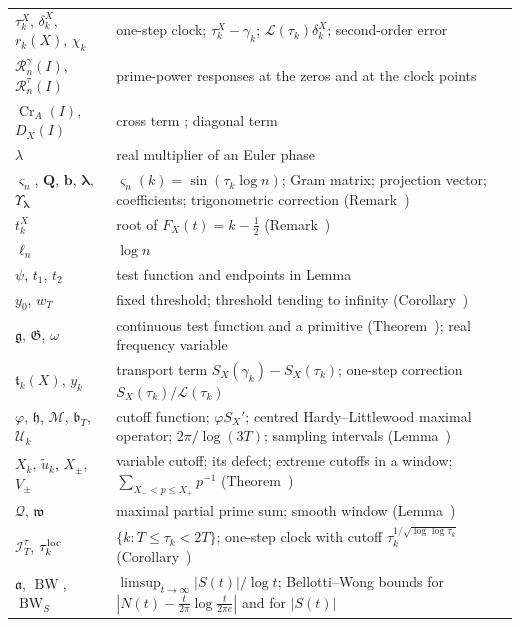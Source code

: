 \documentclass[preprint,12pt]{elsarticle}
\makeatletter
\let\CG@origref\ref
\let\CG@origeqref\eqref
\newcommand{\CG@gettip}[1]{\@ifundefined{CGTip@#1}{Reference: #1}{\csname CGTip@#1\endcsname}}
\DeclareRobustCommand{\CGref}[1]{\pdftooltip{\CG@origref{#1}}{\CG@gettip{#1}}}
\DeclareRobustCommand{\CGeqref}[1]{\pdftooltip{\CG@origeqref{#1}}{\CG@gettip{#1}}}
\numberwithin{equation}{section}
\theoremstyle{plain}
\theoremstyle{definition}
\theoremstyle{remark}
\newcommand{\lL}{\mathcal L}
\newcommand{\Cr}{\operatorname{Cr}}
\newcommand{\BW}{\operatorname{BW}}
\newcommand{\Rg}{\mathcal R^{\gamma}}
\newcommand{\Rt}{\mathcal R^{\tau}}
\newcommand{\BWS}{\operatorname{BW}_S}
\makeatother
\begin{document}
\begin{center}
\begin{longtable}{p{}p{}}
$\tau_k^X$, $\delta_k^X$, $r_k(X)$, $\chi_k$ & one-step clock; $\tau_k^X-\gamma_k$; $\lL(\tau_k)\delta_k^X$; second-order error \CGeqref{eq:one_step_decomposition}\\
$\Rg_n(I)$, $\Rt_n(I)$ & prime-power responses at the zeros and at the clock points \CGeqref{eq:two_responses}\\
$\Cr_A(I)$, $D_X(I)$ & cross term \CGeqref{eq:Cr_def}; diagonal term \CGeqref{eq:full_factor_gain}\\
$\lambda$ & real multiplier of an Euler phase\\
$\varsigma_n$, $\mathbf Q$, $\mathbf b$, $\boldsymbol\lambda$, $\Upsilon_{\boldsymbol\lambda}$ & $\varsigma_n(k)=\sin(\tau_k\log n)$; Gram matrix; projection vector; coefficients; trigonometric correction (Remark~\CGref{rem:matrix_projection})\\
$t_k^X$ & root of $F_X(t)=k-\frac12$ (Remark~\CGref{rem:localization})\\
$\ell_n$ & $\log n$\\
$\psi$, $t_1$, $t_2$ & test function and endpoints in Lemma~\CGref{lem:first_moment_identity}\\
$y_0$, $w_T$ & fixed threshold; threshold tending to infinity (Corollary~\CGref{cor:dichotomy})\\
$\mathfrak g$, $\mathfrak G$, $\omega$ & continuous test function and a primitive (Theorem~\CGref{thm:identity_g}); real frequency variable\\
$\mathfrak t_k(X)$, $y_k$ & transport term $S_X(\gamma_k)-S_X(\tau_k)$; one-step correction $S_X(\tau_k)/\lL(\tau_k)$\\
$\varphi$, $\mathfrak h$, $\mathcal M$, $\mathfrak b_T$, $\mathcal U_k$ & cutoff function; $\varphi S_X'$; centred Hardy--Littlewood maximal operator; $2\pi/\log(3T)$; sampling intervals (Lemma~\CGref{lem:transport})\\
$X_k$, $\tilde u_k$, $X_\pm$, $V_\pm$ & variable cutoff; its defect; extreme cutoffs in a window; $\sum_{X_-<p\le X_+}p^{-1}$ (Theorem~\CGref{thm:variable_cutoff})\\
$\mathcal Q$, $\mathfrak w$ & maximal partial prime sum; smooth window (Lemma~\CGref{lem:maximal_primes})\\
$\mathcal I_T^\tau$, $\tau_k^{\rm loc}$ & $\{k:T\le\tau_k<2T\}$; one-step clock with cutoff $\tau_k^{1/\sqrt{\log\log\tau_k}}$ (Corollary~\CGref{cor:local_clock})\\
$\mathfrak a$, $\BW$, $\BWS$ & $\limsup_{t\to\infty}|S(t)|/\log t$; Bellotti--Wong bounds for $|N(t)-\frac t{2\pi}\log\frac t{2\pi e}|$ and for $|S(t)|$ \CGeqref{eq:BWS_def}\\

\end{longtable}
\end{center}
\end{document}
